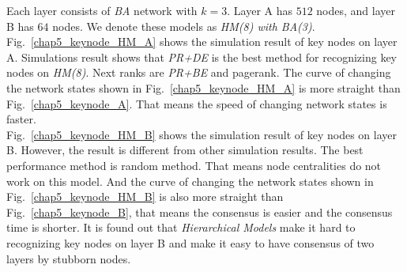 Each layer consists of \textit{BA} network with $k=3$. Layer A has $512$ nodes, and layer B has $64$ nodes. We denote these models as \textit{HM(8) with BA(3)}.\\
Fig.~\ref{chap5_keynode_HM_A} shows the simulation result of key nodes on layer A. Simulations result shows that \textit{PR+DE} is the best method for recognizing key nodes on \textit{HM(8)}. Next ranks are \textit{PR+BE} and pagerank. The curve of changing the network states shown in Fig.~\ref{chap5_keynode_HM_A} is more straight than Fig.~\ref{chap5_keynode_A}. That means the speed of changing network states is faster. \\
Fig.~\ref{chap5_keynode_HM_B} shows the simulation result of key nodes on layer B. However, the result is different from other simulation results. The best performance method is random method. That means node centralities do not work on this model. And the curve of changing the network states shown in Fig.~\ref{chap5_keynode_HM_B} is also more straight than Fig.~\ref{chap5_keynode_B}, that means the consensus is easier and the consensus time is shorter. It is found out that \textit{Hierarchical Models} make it hard to recognizing key nodes on layer B and make it easy to have consensus of two layers by stubborn nodes. \\

